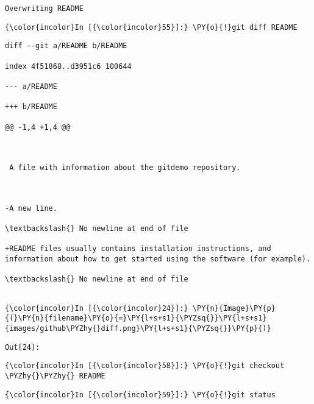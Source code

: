     \begin{Verbatim}[commandchars=\\\{\}]
Overwriting README

    \end{Verbatim}

    \begin{Verbatim}[commandchars=\\\{\}]
{\color{incolor}In [{\color{incolor}55}]:} \PY{o}{!}git diff README
\end{Verbatim}

    \begin{Verbatim}[commandchars=\\\{\}]
diff --git a/README b/README

index 4f51868..d3951c6 100644

--- a/README

+++ b/README

@@ -1,4 +1,4 @@

 

 A file with information about the gitdemo repository.

 

-A new line.

\textbackslash{} No newline at end of file

+README files usually contains installation instructions, and information about how to get started using the software (for example).

\textbackslash{} No newline at end of file


    \end{Verbatim}



    \begin{Verbatim}[commandchars=\\\{\}]
{\color{incolor}In [{\color{incolor}24}]:} \PY{n}{Image}\PY{p}{(}\PY{n}{filename}\PY{o}{=}\PY{l+s+s1}{\PYZsq{}}\PY{l+s+s1}{images/github\PYZhy{}diff.png}\PY{l+s+s1}{\PYZsq{}}\PY{p}{)}
\end{Verbatim}
\texttt{\color{outcolor}Out[{\color{outcolor}24}]:}




    \begin{Verbatim}[commandchars=\\\{\}]
{\color{incolor}In [{\color{incolor}58}]:} \PY{o}{!}git checkout \PYZhy{}\PYZhy{} README
\end{Verbatim}

    \begin{Verbatim}[commandchars=\\\{\}]
{\color{incolor}In [{\color{incolor}59}]:} \PY{o}{!}git status
\end{Verbatim}


